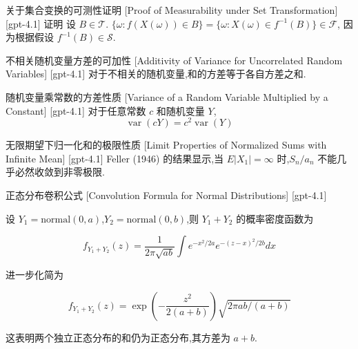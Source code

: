 \documentclass[UTF8]{ctexart}
\begin{document}
    
    
    \begin{prf}
        {关于集合变换的可测性证明}
        [Proof of Measurability under Set Transformation]
        [gpt-4.1]
        证明 设 $B \in \mathcal{T}$.
$\{ \omega : f(X(\omega)) \in B \} = \{ \omega : X(\omega) \in f^{-1}(B) \} \in \mathcal{F}$, 因为根据假设 $f^{-1}(B) \in \mathcal{S}$.
    \end{prf}
    
    
    
    \begin{ppt}
        {不相关随机变量方差的可加性}
        [Additivity of Variance for Uncorrelated Random Variables]
        [gpt-4.1]
        对于不相关的随机变量,和的方差等于各自方差之和.
    \end{ppt}
    
    
    
    \begin{ppt}
        {随机变量乘常数的方差性质}
        [Variance of a Random Variable Multiplied by a Constant]
        [gpt-4.1]
        对于任意常数 $c$ 和随机变量 $Y$,
\[
\operatorname{var}(cY) = c^2 \operatorname{var}(Y)
\]
    \end{ppt}
    
    
    
    \begin{thm}
        {无限期望下归一化和的极限性质}
        [Limit Properties of Normalized Sums with Infinite Mean]
        [gpt-4.1]
        Feller (1946) 的结果显示,当 $E | X_{1} | = \infty$ 时,$S_{n} / a_{n}$ 不能几乎必然收敛到非零极限.
    \end{thm}
    
    
    
    \begin{thm}
        {正态分布卷积公式}
        [Convolution Formula for Normal Distributions]
        [gpt-4.1]
        
设 $Y_1 = \mathrm{normal}(0, a)$,$Y_2 = \mathrm{normal}(0, b)$,则 $Y_1 + Y_2$ 的概率密度函数为

\[
f_{Y_1 + Y_2}(z) = \frac{1}{2\pi \sqrt{a b}} \int e^{-x^2 / 2a} e^{-(z - x)^2 / 2b} d x
\]

进一步化简为

\[
f_{Y_1 + Y_2}(z) = \exp\left( - \frac{z^2}{2(a + b)} \right) \sqrt{2 \pi a b / (a + b)}
\]

这表明两个独立正态分布的和仍为正态分布,其方差为 $a + b$.

    \end{thm}
    
\end{document}
